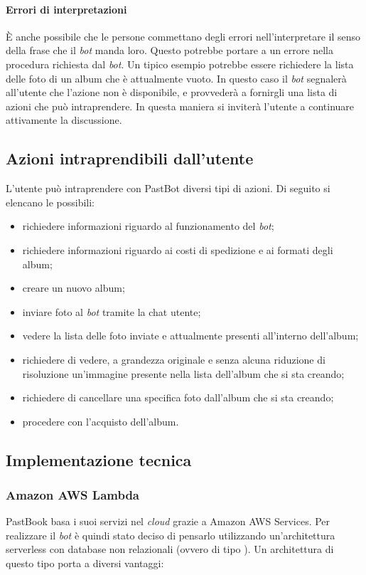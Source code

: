 \paragraph*{Errori di interpretazioni} È anche possibile che le persone
commettano degli errori nell'interpretare il senso della frase che il
\textit{bot} manda loro. Questo potrebbe portare a un errore nella procedura
richiesta dal \textit{bot}. Un tipico esempio potrebbe essere richiedere la
lista delle foto di un album che è attualmente vuoto. In questo caso il
\textit{bot} segnalerà all'utente che l'azione non è disponibile, e provvederà
a fornirgli una lista di azioni che può intraprendere. In questa maniera si
inviterà l'utente a continuare attivamente la discussione.

\subsection{Azioni intraprendibili dall'utente}

L'utente può intraprendere con PastBot diversi tipi di azioni. Di seguito si
elencano le possibili:

\begin{itemize}

  \item richiedere informazioni riguardo al funzionamento del \textit{bot};
  \item richiedere informazioni riguardo ai costi di spedizione e ai formati
degli album;
  \item creare un nuovo album;
  \item inviare foto al \textit{bot} tramite la chat utente;
  \item vedere la lista delle foto inviate e attualmente presenti all'interno
dell'album;
  \item richiedere di vedere, a grandezza originale e senza alcuna riduzione di
risoluzione un'immagine presente nella lista dell'album che si sta creando;
  \item richiedere di cancellare una specifica foto dall'album che si sta
creando;
  \item procedere con l'acquisto dell'album.
\end{itemize}

\subsection{Implementazione tecnica}

\subsubsection{Amazon AWS Lambda}
PastBook basa i suoi servizi nel \textit{cloud} grazie a Amazon AWS Services.
Per realizzare il \textit{bot} è quindi stato deciso di pensarlo utilizzando
un'architettura serverless con database non relazionali (ovvero di tipo
). Un architettura di questo tipo porta a diversi
vantaggi:

